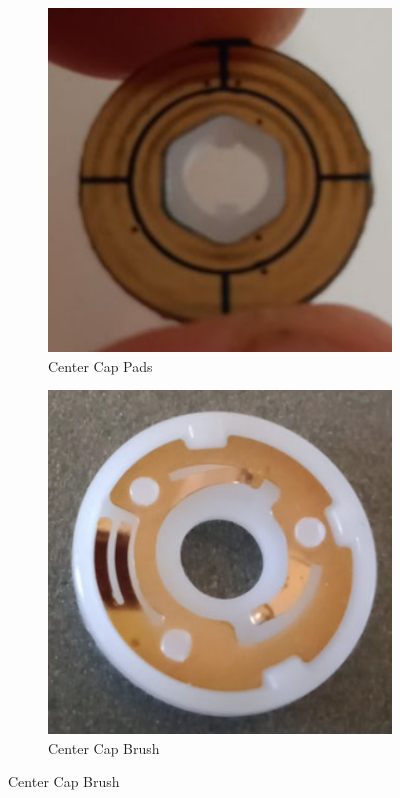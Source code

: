 \begin{figure}[h]
\begin{subfigure}{0.25\textwidth}
    \end{subfigure}%
    \begin{subfigure}{0.25\textwidth}
        \centering
        \caption{Center Cap Pads \cite{eggins-giiker-internals}}
        \label{fig:giiker-center-pads}
        \includegraphics[width=.90\linewidth]{Figures/3 State of the Art/giiker-center-pads.png}
    \end{subfigure}%
    \begin{subfigure}{0.25\textwidth}
        \centering
        \caption{Center Cap Brush \cite{eggins-giiker-internals}}
        \label{fig:giiker-center-brush}
        \includegraphics[width=.90\linewidth]{Figures/3 State of the Art/giiker-center-brush.png}
    \end{subfigure}%
\end{figure}

